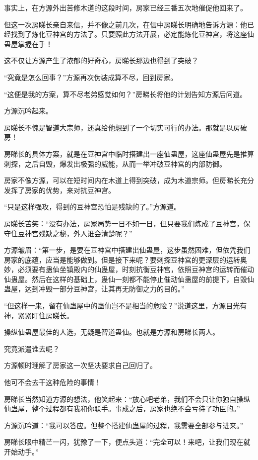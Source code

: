 \begin{this_body}
事实上，在方源外出苦修木道的这段时间，房家已经三番五次地催促他回来了。

但这一次房睇长亲自来信，并不像之前几次，在信中房睇长明确地告诉方源：他已经找到了炼化豆神宫的方法了。只要照此方法开展，必定能炼化豆神宫，将这座仙蛊屋掌握在手！

这不仅让方源产生了浓郁的好奇心，房睇长那边也得到了突破？

“究竟是怎么回事？”方源再次伪装成算不尽，回到房家。

“这便是我的方案，算不尽老弟感觉如何？”房睇长将他的计划告知方源后问道。

方源沉吟起来。

房睇长不愧是智道大宗师，还真给他想到了一个切实可行的办法。那就是以房破房！

房睇长的具体方案，就是在豆神宫中临时搭建出一座仙蛊屋，这座仙蛊屋先是推算刺探，之后自毁，爆发出极强的威能，从而一举冲破豆神宫的内部防御。

房家不像方源，可以在短时间内在木道上得到突破，成为木道宗师。但房睇长充分发挥了房家的优势，来对抗豆神宫。

“只是这样强攻，得到的豆神宫恐怕是残缺的了。”方源道。

房睇长苦笑：“没有办法，房家局势一日不如一日，但只要我们炼成了豆神宫，保守住豆神宫残缺之秘，外人谁会清楚呢？”

方源皱眉：“第一步，是要在豆神宫中搭建出仙蛊屋，这步虽然困难，但依凭我们房家的底蕴，应当是能够做到。但是接下来呢？要刺探豆神宫的更深层的运转奥妙，必须要有蛊仙坐镇殿内的仙蛊屋，时刻抗衡豆神宫，依照豆神宫的运转而催动仙蛊屋。然后在这样的基础上，蛊仙一刻都不能停止催动仙蛊屋的前提下，自毁仙蛊屋，达到冲毁一部分豆神宫，让其再无防御之力的目的。”

“但这样一来，留在仙蛊屋中的蛊仙岂不是相当的危险？”说道这里，方源目光有神，紧紧盯住房睇长。

操纵仙蛊屋最佳的人选，无疑是智道蛊仙。也就是方源和房睇长两人。

究竟派遣谁去呢？

方源顿时理解了房家这一次坚决要求自己回归了。

他可不会去干这种危险的事情！

房睇长当然知道方源的想法，他笑起来：“放心吧老弟，我们不会只让你独自操纵仙蛊屋，整个过程都有我和你联手。事成之后，房家也绝不会亏待了功臣的。”

方源沉吟道：“我可以答应。但整个搭建仙蛊屋的过程，我需要全部参与进来。”

房睇长眼中精芒一闪，犹豫了一下，便点头道：“完全可以！来吧，让我们现在就开始动手。”


\end{this_body}
